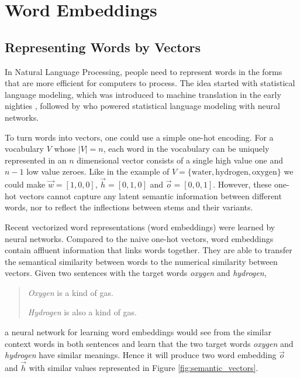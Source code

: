\documentclass[thesis,fonts=libertine]{cluu}
\begin{document}
\section{Word Embeddings}
\subsection{Representing Words by Vectors}

In Natural Language Processing, people need to represent words in the forms that are more efficient for computers to process. The idea started with statistical language modeling, which was introduced to machine translation in the early nighties \parencite{brown-etal-1990-statistical}, followed by \textcite{bengio2003neural} who powered statistical language modeling with neural networks.

To turn words into vectors, one could use a simple one-hot encoding. For a vocabulary $V$ whose $|V|=n$, each word in the vocabulary can be uniquely represented in an $n$ dimensional vector consists of a single high value one and $n-1$ low value zeroes. Like in the example of $V=\{\text{water}, \text{hydrogen}, \text{oxygen}\}$ we could make $\vec{w}=[1, 0, 0]$, $\vec{h}=[0, 1, 0]$ and $\vec{o}=[0, 0, 1]$. However, these one-hot vectors cannot capture any latent semantic information between different words, nor to reflect the inflections between stems and their variants.

Recent vectorized word representations (word embeddings) were learned by neural networks. Compared to the naive one-hot vectors, word embeddings contain affluent information that links words together. They are able to transfer the semantical similarity between words to the numerical similarity between vectors. Given two sentences with the target words \textit{oxygen} and \textit{hydrogen},

\begin{quotation}
  \textit{Oxygen} is a kind of gas.

  \textit{Hydrogen} is also a kind of gas.
\end{quotation}

\noindent a neural network for learning word embeddings would see from the similar context words in both sentences and learn that the two target words \textit{oxygen} and \textit{hydrogen} have similar meanings. Hence it will produce two word embedding $\vec{o}$ and $\vec{h}$ with similar values represented in Figure \ref{fig:semantic_vectors}.
\end{document}
